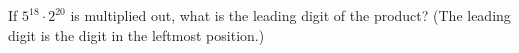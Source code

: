 If $5^{18}\cdot2^{20}$ is multiplied out, what is the leading digit of the product? (The leading digit is the digit in the leftmost position.)
